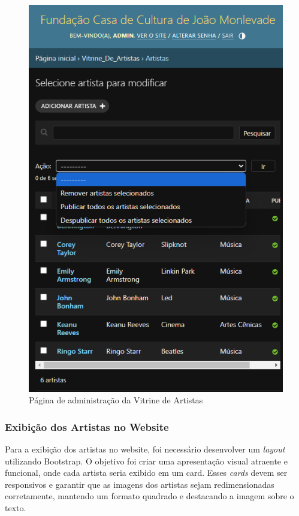 \begin{figure}[htb]
	\caption{\label{fig_adm_vitrine}Página de administração da Vitrine de Artistas}
	\begin{center}
	    \includegraphics[scale=0.5]{./img/admin_artista.png}
	\end{center}
\end{figure}

\subsubsection{Exibição dos Artistas no Website}

Para a exibição dos artistas no website, foi necessário desenvolver um \textit{layout} utilizando Bootstrap. O objetivo foi criar uma apresentação visual atraente e funcional, onde cada artista seria exibido em um card. Esses \textit{cards} devem ser responsivos e garantir que as imagens dos artistas sejam redimensionadas corretamente, mantendo um formato quadrado e destacando a imagem sobre o texto.

